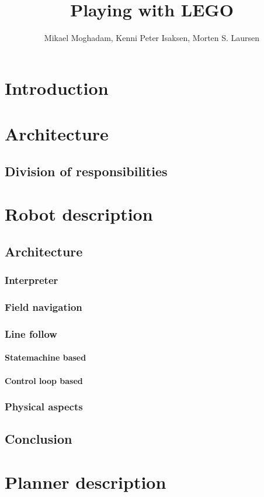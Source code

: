 \documentclass[draft, english, a4paper]{report}
\title{Playing with LEGO}
\author{Mikael Moghadam, Kenni Peter Isaksen, Morten S. Laursen}
\begin{document}
\maketitle %

\chapter{Introduction}
\newpage
\chapter{Architecture}
	\section{Division of responsibilities}
\chapter{Robot description}
	\section{Architecture}
		\subsection{Interpreter} %
		\subsection{Field navigation} %
		\subsection{Line follow} %
			\subsubsection{Statemachine based}
			\subsubsection{Control loop based}
		\subsection{Physical aspects} %
	\section{Conclusion} %
\chapter{Planner description}
	
\end{document}
